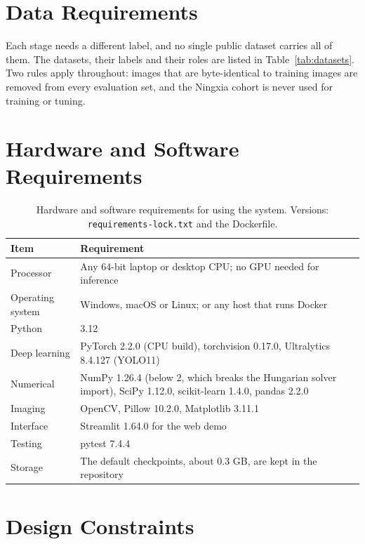 \section{Data Requirements}

Each stage needs a different label, and no single public dataset carries all of them. The datasets,
their labels and their roles are listed in Table~\ref{tab:datasets}. Two rules apply throughout:
images that are byte-identical to training images are removed from every evaluation set, and the
Ningxia cohort is never used for training or tuning.

\section{Hardware and Software Requirements}

\begin{table}[!htbp]
\centering
\caption[Hardware and software requirements]{Hardware and software requirements for using the system.
Versions: \texttt{requirements-lock.txt} and the Dockerfile.}
\label{tab:hwsw}
\small
\begin{tabularx}{\textwidth}{@{}L{4.0cm}Y@{}}
\toprule
Item & Requirement\\
\midrule
Processor & Any 64-bit laptop or desktop CPU; no GPU needed for inference\\
Operating system & Windows, macOS or Linux; or any host that runs Docker\\
Python & 3.12\\
Deep learning & PyTorch 2.2.0 (CPU build), torchvision 0.17.0, Ultralytics 8.4.127 (YOLO11)\\
Numerical & NumPy 1.26.4 (below 2, which breaks the Hungarian solver import), SciPy 1.12.0, scikit-learn 1.4.0, pandas 2.2.0\\
Imaging & OpenCV, Pillow 10.2.0, Matplotlib 3.11.1\\
Interface & Streamlit 1.64.0 for the web demo\\
Testing & pytest 7.4.4\\
Storage & The default checkpoints, about 0.3 GB, are kept in the repository\\
\bottomrule
\end{tabularx}
\end{table}

\section{Design Constraints}

